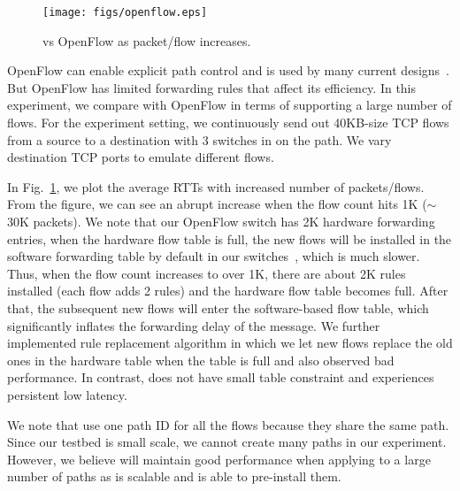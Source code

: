 \begin{figure}[t]
\centering
\texttt{[image: figs/openflow.eps]}
\caption{\sys vs OpenFlow as packet/flow increases.} \label{fig:openflow}
\end{figure}



OpenFlow can enable explicit path control and is used by many current designs~\cite{hedera,microTE,elastictree,swan,zupdate}. But OpenFlow has limited forwarding rules that affect its efficiency. In this experiment, we compare \sys with OpenFlow in terms of supporting a large number of flows. For the experiment setting, we continuously send out 40KB-size TCP flows from a source to a destination with 3 switches in on the path. We vary destination TCP ports to emulate different flows.

In Fig.~\ref{fig:openflow}, we plot the average RTTs with increased number of packets/flows. From the figure, we can see an abrupt increase when the flow count hits 1K ($\sim$30K packets). We note that our OpenFlow switch has 2K hardware forwarding entries, when the hardware flow table is full, the new flows will be installed in the software forwarding table by default in our switches~\cite{softtable}, which is much slower. Thus, when the flow count increases to over 1K, there are about 2K rules installed (each flow adds 2 rules) and the hardware flow table becomes full. After that, the subsequent new flows will enter the software-based flow table, which significantly inflates the forwarding delay of the message. We further implemented rule replacement algorithm in which we let new flows replace the old ones in the hardware table when the table is full and also observed bad performance. In contrast, \sys does not have small table constraint and experiences persistent low latency.

We note that \sys use one path ID for all the flows because they share the same path. Since our testbed is small scale, we cannot create many paths in our experiment. However, we believe \sys will maintain good performance when applying to a large number of paths as \sys is scalable and is able to pre-install them.



%


